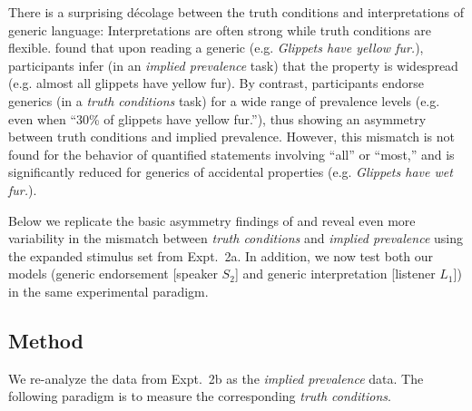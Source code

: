 \documentclass[12pt,letterpaper]{article}
\begin{document}
There is a surprising d\'{e}colage between the truth conditions and interpretations of generic language: Interpretations are often strong while truth conditions are flexible. 
 found that upon reading a generic (e.g. \emph{Glippets have yellow fur.}), participants infer (in an \emph{implied prevalence} task) that the property is widespread (e.g. almost all glippets have yellow fur).
By contrast, participants endorse generics (in a \emph{truth conditions} task) for a wide range of prevalence levels (e.g. even when ``30\% of glippets have yellow fur.''), thus showing an asymmetry between truth conditions and implied prevalence. 
However, this mismatch is not found for the behavior of quantified statements involving ``all'' or ``most,'' and 
is significantly reduced for generics of accidental properties  (e.g. \emph{Glippets have wet fur.}). %



Below we replicate the basic asymmetry findings of  and reveal even more variability in the mismatch between \emph{truth conditions} and \emph{implied prevalence} using the expanded stimulus set from Expt.~2a.
In addition, we now test both our models (generic endorsement [speaker $S_2$] and generic interpretation [listener $L_1$]) in the same experimental paradigm. %


\subsection*{Method}

We re-analyze the data from Expt.~2b as the \emph{implied prevalence} data.
The following paradigm is to measure the corresponding \emph{truth conditions}.
\end{document}
